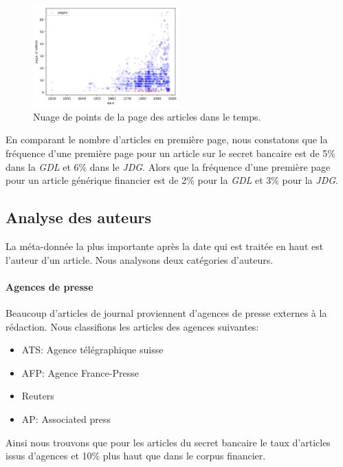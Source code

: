 \documentclass[a4paper, 11pt]{article}
\begin{document}
\begin{figure}
\centering
\includegraphics[width=0.5\textwidth ]{methodology/scatter.png}
\caption{Nuage de points de la page des articles dans le temps.}
\end{figure}

En comparant le nombre d'articles en première page, nous constatons que
la fréquence d'une première page pour un article sur le secret bancaire
est de 5\% dans la \emph{GDL} et 6\% dans le \emph{JDG}. Alors que la
fréquence d'une première page pour un article générique financier est de
2\% pour la \emph{GDL} et 3\% pour la \emph{JDG}.

\hypertarget{analyse-des-auteurs}{%
\subsection{Analyse des auteurs}\label{analyse-des-auteurs}}

La méta-donnée la plus importante après la date qui est traitée en haut
est l'auteur d'un article. Nous analysons deux catégories d'auteurs.

\hypertarget{agences-de-presse}{%
\paragraph{Agences de presse}\label{agences-de-presse}}

Beaucoup d'articles de journal proviennent d'agences de presse externes
à la rédaction. Nous classifions les articles des agences suivantes:

\begin{itemize}
\item
  ATS: Agence télégraphique suisse
\item
  AFP: Agence France-Presse
\item
  Reuters
\item
  AP: Associated press
\end{itemize}

Ainsi nous trouvons que pour les articles du secret bancaire le taux
d'articles issus d'agences et 10\% plus haut que dans le corpus
financier.
\end{document}
